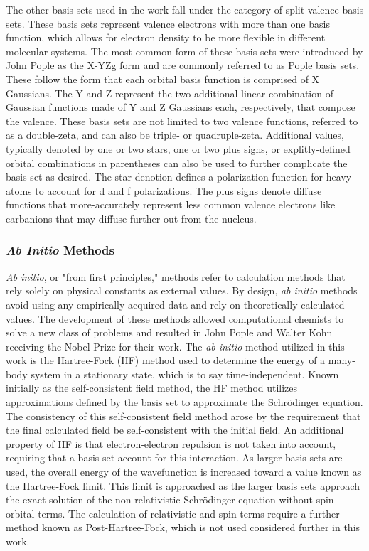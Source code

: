 The other basis sets used in the work fall under the category of split-valence basis sets.
These basis sets represent valence electrons with more than one basis function, which allows for electron density to be more flexible in different molecular systems.
The most common form of these basis sets were introduced by John Pople as the X-YZg form and are commonly referred to as Pople basis sets.\cite{PopleBS}
These follow the form that each orbital basis function is comprised of X Gaussians.
The Y and Z represent the two additional linear combination of Gaussian functions made of Y and Z Gaussians each, respectively, that compose the valence. 
These basis sets are not limited to two valence functions, referred to as a double-zeta, and can also be triple- or quadruple-zeta.
Additional values, typically denoted by one or two stars, one or two plus signs, or explitly-defined orbital combinations in parentheses can also be used to further complicate the basis set as desired.
The star denotion defines a polarization function for heavy atoms to account for d and f polarizations.
The plus signs denote diffuse functions that more-accurately represent less common valence electrons like carbanions that may diffuse further out from the nucleus.


\subsubsection{\textit{Ab Initio} Methods}

\textit{Ab initio}, or "from first principles," methods refer to calculation methods that rely solely on physical constants as external values.
By design, \textit{ab initio} methods avoid using any empirically-acquired data and rely on theoretically calculated values.
The development of these methods allowed computational chemists to solve a new class of problems and resulted in John Pople and Walter Kohn receiving the Nobel Prize for their work.
The \textit{ab initio} method utilized in this work is the Hartree-Fock (HF) method used to determine the energy of a many-body system in a stationary state, which is to say time-independent.\cite{hartree_1928}
Known initially as the self-consistent field method, the HF method utilizes approximations defined by the basis set to approximate the Schrödinger equation. 
The consistency of this self-consistent field method arose by the requirement that the final calculated field be self-consistent with the initial field.
An additional property of HF is that electron-electron repulsion is not taken into account, requiring that a basis set account for this interaction.
As larger basis sets are used, the overall energy of the wavefunction is increased toward a value known as the Hartree-Fock limit.
This limit is approached as the larger basis sets approach the exact solution of the non-relativistic Schrödinger equation without spin orbital terms.
The calculation of relativistic and spin terms require a further method known as Post-Hartree-Fock, which is not used considered further in this work.

